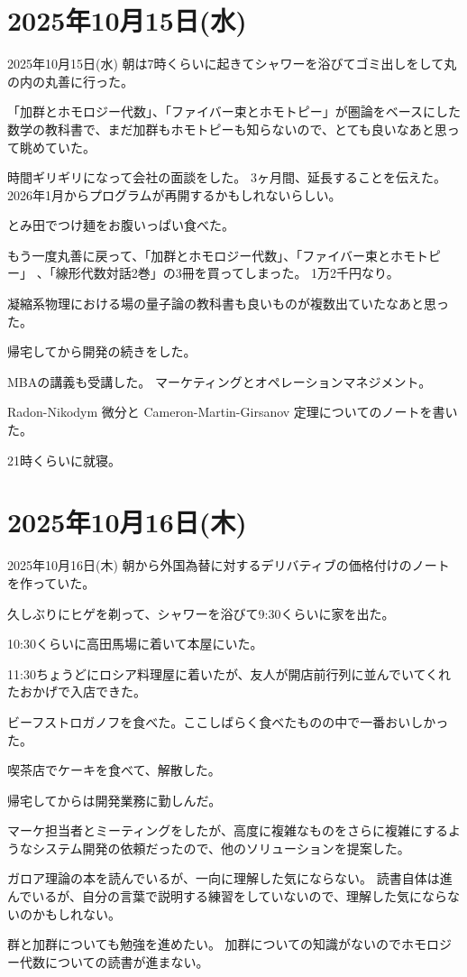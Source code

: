 \documentclass[dvipdfmx, autodetect-engine, aspectratio=169, 10.5pt]{beamer}
\begin{document}
\section{2025年10月15日(水)}

\begin{frame}{2025年10月15日(水)}
	\scriptsize
	朝は7時くらいに起きてシャワーを浴びてゴミ出しをして丸の内の丸善に行った。

	「加群とホモロジー代数」、「ファイバー束とホモトピー」が圏論をベースにした数学の教科書で、まだ加群もホモトピーも知らないので、とても良いなあと思って眺めていた。

	時間ギリギリになって会社の面談をした。
	3ヶ月間、延長することを伝えた。
	2026年1月からプログラムが再開するかもしれないらしい。

	とみ田でつけ麺をお腹いっぱい食べた。

	もう一度丸善に戻って、「加群とホモロジー代数」、「ファイバー束とホモトピー」 、「線形代数対話2巻」の3冊を買ってしまった。
	1万2千円なり。

	凝縮系物理における場の量子論の教科書も良いものが複数出ていたなあと思った。

	帰宅してから開発の続きをした。

	MBAの講義も受講した。
	マーケティングとオペレーションマネジメント。

	Radon-Nikodym 微分と Cameron-Martin-Girsanov 定理についてのノートを書いた。

	21時くらいに就寝。
\end{frame}

\section{2025年10月16日(木)}

\begin{frame}{2025年10月16日(木)}
	朝から外国為替に対するデリバティブの価格付けのノートを作っていた。

	久しぶりにヒゲを剃って、シャワーを浴びて9:30くらいに家を出た。

	10:30くらいに高田馬場に着いて本屋にいた。

	11:30ちょうどにロシア料理屋に着いたが、友人が開店前行列に並んでいてくれたおかげで入店できた。

	ビーフストロガノフを食べた。ここしばらく食べたものの中で一番おいしかった。

	喫茶店でケーキを食べて、解散した。

	帰宅してからは開発業務に勤しんだ。

	マーケ担当者とミーティングをしたが、高度に複雑なものをさらに複雑にするようなシステム開発の依頼だったので、他のソリューションを提案した。

	ガロア理論の本を読んでいるが、一向に理解した気にならない。
	読書自体は進んでいるが、自分の言葉で説明する練習をしていないので、理解した気にならないのかもしれない。

	群と加群についても勉強を進めたい。
	加群についての知識がないのでホモロジー代数についての読書が進まない。
\end{frame}
\end{document}
